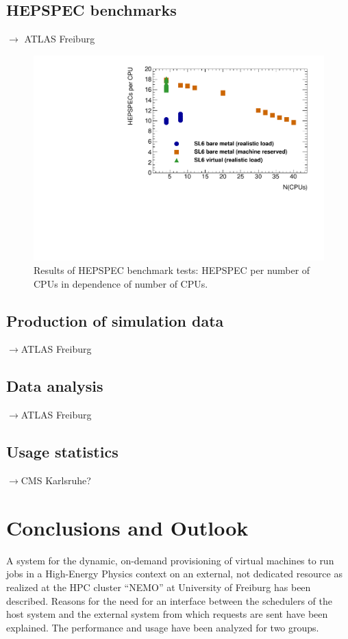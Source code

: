 \subsection{HEPSPEC benchmarks}
$\to$ ATLAS Freiburg
\begin{figure}[htbp]
  \includegraphics[width=\columnwidth]{figures/HEPSPECpCPUvsCPU.pdf}
\caption{Results of HEPSPEC benchmark tests: HEPSPEC per number of
  CPUs in dependence of number of CPUs.}
\label{fig:HEPSPECpCPUvsCPU-atlas}
\end{figure}




\subsection{Production of simulation data}
$\to$ATLAS Freiburg
\subsection{Data analysis}
$\to$ATLAS Freiburg 

\subsection{Usage statistics}
$\to$CMS Karlsruhe?

\section{Conclusions and Outlook}


A system for the dynamic, on-demand provisioning of virtual machines
to run jobs in a High-Energy Physics context on an external, not
dedicated resource as realized at the HPC
cluster ``NEMO'' at University of Freiburg has been described. 
Reasons for the need for an interface between the schedulers of the host system
and the external system from which requests are sent have been
explained. 
The performance and usage have been analyzed for two groups. 

